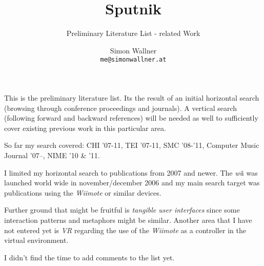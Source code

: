 \documentclass[10pt,a4paper]{scrartcl}
\author{Simon Wallner\\\texttt{me@simonwallner.at}}
\title{Sputnik}
\subtitle{Preliminary Literature List - related Work}
\begin{document}
\maketitle

This is the preliminary literature list. Its the result of an initial horizontal search (browsing through conference proceedings and journals). A vertical search (following forward and backward references) will be needed as well to sufficiently cover existing previous work in this particular area.

So far my search covered: CHI '07-11, TEI '07-11, SMC '08-'11, Computer Music Journal '07--, NIME '10 \& '11.

I limited my horizontal search to publications from 2007 and newer. The \emph{wi}i was launched world wide in november/december 2006 and my main search target was publications using the \emph{Wiimote} or similar devices. 

Further ground that might be fruitful is \emph{tangible user interfaces} since some interaction patterns and metaphors might be similar. Another area that I have not entered yet is \emph{VR} regarding the use of the \emph{Wiimote} as a controller in the virtual environment.

I didn't find the time to add comments to the list yet.

\nocite{*}



\end{document}
